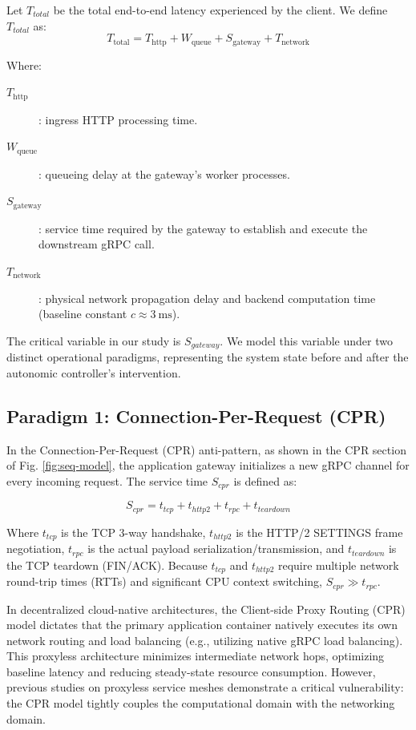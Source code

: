 \documentclass{ieeeaccess}
\begin{document}
Let $T_{total}$ be the total end-to-end latency experienced by the client. We define $T_{total}$ as:
\begin{equation}
    T_{\text{total}} = T_{\text{http}} + W_{\text{queue}} + S_{\text{gateway}} + T_{\text{network}}
\end{equation}

Where:
\begin{description}
  \item[$T_{\text{http}}$]    : ingress HTTP processing time.
  \item[$W_{\text{queue}}$]   : queueing delay at the gateway's worker processes.
  \item[$S_{\text{gateway}}$] : service time required by the gateway to establish and execute the downstream gRPC call.
  \item[$T_{\text{network}}$] : physical network propagation delay and backend computation time (baseline constant $c \approx 3\ \text{ms}$).
\end{description}

The critical variable in our study is $S_{gateway}$. We model this variable under two distinct operational paradigms, representing the system state before and after the autonomic controller's intervention.

\subsection{Paradigm 1: Connection-Per-Request (CPR)}
\label{sec2.1}

In the Connection-Per-Request (CPR) anti-pattern, as shown in the CPR section of Fig. \ref{fig:seq-model}, the application gateway initializes a new gRPC channel for every incoming request. The service time $S_{cpr}$ is defined as:

\begin{equation}
    S_{cpr} = t_{tcp} + t_{http2} + t_{rpc} + t_{teardown}
\end{equation}

Where $t_{tcp}$ is the TCP 3-way handshake, $t_{http2}$ is the HTTP/2 SETTINGS frame negotiation, $t_{rpc}$ is the actual payload serialization/transmission, and $t_{teardown}$ is the TCP teardown (FIN/ACK). Because $t_{tcp}$ and $t_{http2}$ require multiple network round-trip times (RTTs) and significant CPU context switching, $S_{cpr} \gg t_{rpc}$.

In decentralized cloud-native architectures, the Client-side Proxy Routing (CPR) model dictates that the primary application container natively executes its own network routing and load balancing (e.g., utilizing native gRPC load balancing). This proxyless architecture minimizes intermediate network hops, optimizing baseline latency and reducing steady-state resource consumption. However, previous studies on proxyless service meshes demonstrate a critical vulnerability: the CPR model tightly couples the computational domain with the networking domain.
\end{document}
